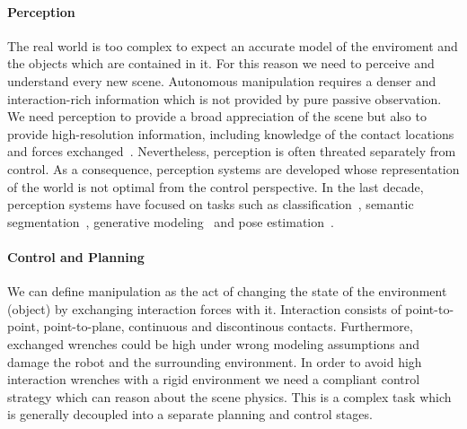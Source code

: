 \paragraph{Perception} The real world is too complex to expect an accurate model of the enviroment and the objects which are contained in it. For this reason we need to perceive and understand every new scene. Autonomous manipulation requires a denser and interaction-rich information which is not provided by pure passive observation. We need perception to provide a broad appreciation of the scene but also to provide high-resolution information, including knowledge of the contact locations and forces exchanged~\cite{mason2018toward}. Nevertheless, perception is often threated separately from control. As a consequence, perception systems are developed whose representation of the world is not optimal from the control perspective. In the last decade, perception systems have focused on tasks such as classification~\citep{redmon2016you}, semantic segmentation~\cite{badrinarayanan2017segnet}, generative modeling~\citep{karras2019stylebased} and pose estimation~\cite{xiang2017posecnn}. 

\paragraph{Control and Planning} We can define manipulation as the act of changing the state of the environment (object) by exchanging interaction forces with it. Interaction consists of point-to-point, point-to-plane, continuous and discontinous contacts. Furthermore, exchanged wrenches could be high under wrong modeling assumptions and damage the robot and the surrounding environment. In order to avoid high interaction wrenches with a rigid environment we need a compliant control strategy which can reason about the scene physics. This is a complex task which is generally decoupled into a separate planning and control stages.  



